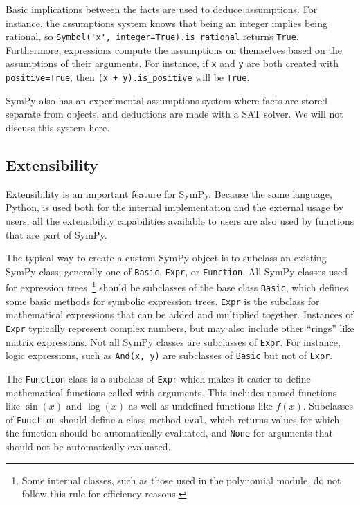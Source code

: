 Basic implications between the facts are used to deduce assumptions. For
instance, the assumptions system knows that being an integer implies being
rational, so \verb|Symbol('x', integer=True).is_rational| returns
\texttt{True}. Furthermore, expressions compute the assumptions on themselves
based on the assumptions of their arguments. For instance, if \texttt{x} and
\texttt{y} are both created with \texttt{positive=True}, then
\verb|(x + y).is_positive| will be \texttt{True}.

SymPy also has an experimental assumptions system where facts are stored
separate from objects, and deductions are made with a SAT solver. We will not
discuss this system here.

\subsection{Extensibility}

Extensibility is an important feature for SymPy. Because the same language,
Python, is used both for the internal implementation and the external usage by
users, all the extensibility capabilities available to users are also used by
functions that are part of SymPy.

The typical way to create a custom SymPy object is to subclass an existing
SymPy class, generally one of \texttt{Basic}, \texttt{Expr}, or
\texttt{Function}. All SymPy classes used for expression trees~\footnote{Some
  internal classes, such as those used in the polynomial module, do not follow
  this rule for efficiency reasons.} should be subclasses of the base class
\texttt{Basic}, which defines some basic methods for symbolic expression
trees. \texttt{Expr} is the subclass for mathematical expressions that can be
added and multiplied together. Instances of \texttt{Expr} typically represent
complex numbers, but may also include other ``rings'' like matrix expressions.
Not all SymPy classes are subclasses of \texttt{Expr}. For instance, logic expressions, such
as \verb|And(x, y)| are subclasses of \texttt{Basic} but not of \texttt{Expr}.

The \texttt{Function} class is a subclass of \texttt{Expr} which makes it
easier to define mathematical functions called with arguments. This includes
named functions like $\sin(x)$ and $\log(x)$ as well as undefined functions
like $f(x)$. Subclasses of \texttt{Function} should define a
class method \texttt{eval}, which returns values for which the function should
be automatically evaluated, and \texttt{None} for arguments that should not be
automatically evaluated.

